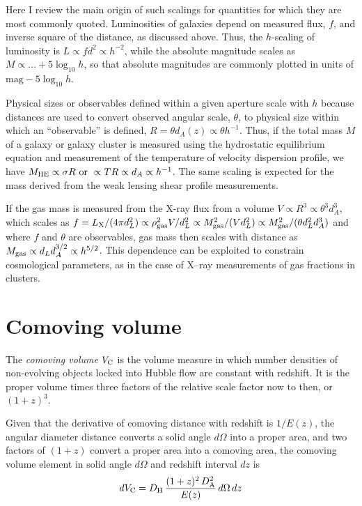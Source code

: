 Here I review the main origin of such scalings for quantities for which they are most commonly quoted. 
Luminosities of galaxies depend on measured flux, $f$, and inverse square of the distance, as discussed above. 
Thus, the $h$-scaling of luminosity is $L\propto f d^{2}\propto h^{-2}$, while the absolute magnitude scales as $M\propto \ldots +5\log_{10}h$, so that absolute magnitudes are commonly plotted in units of $\mathrm{mag}-5\log_{10}h$. 

Physical sizes or observables defined within a given aperture scale with $h$ 
because distances are used to convert observed angular scale, $\theta$, to physical
size within which an ``observable'' is defined, 
$R=\theta d_A(z)\propto \theta h^{-1}$.
Thus, if the total mass $M$ of a galaxy or galaxy cluster is measured using the hydrostatic equilibrium equation and measurement of the temperature of velocity dispersion profile, we have $M_{\rm HE}\propto \sigma R\ \mathrm{or}\ \propto T R\propto d_A\propto h^{-1}$. The same scaling is expected for the mass derived from the weak lensing shear profile measurements. 

If the gas mass is measured from the X-ray flux from a volume
$V\propto R^3\propto \theta^3d_A^3$, which scales as $f=L_{\rm X}/(4\pi
d_L^2)\propto \rho_{\rm gas}^2 V/d_L^2\propto M_{\rm gas}^2/(Vd_L^2)\propto
M_{\rm gas}^2/(\theta d_L^2 d_A^3)$ and where $f$ and $\theta$ are
observables, gas mass then scales with distance as $M_{\rm gas}\propto d_L
d_A^{3/2}\propto h^{5/2}$. This dependence can be exploited to
constrain cosmological parameters, as in the case of X--ray
measurements of gas fractions in clusters.  

\section{Comoving volume}
\label{sec:Vcom}

The {\it comoving volume\/} $V_{\rm C}$ is the volume measure in which
number densities of non-evolving objects locked into Hubble flow are
constant with redshift.  It is the proper volume times three factors
of the relative scale factor now to then, or $(1+z)^3.$

Given that the
derivative of comoving distance with redshift is $1/E(z)$, the angular diameter distance converts a solid angle
$d\Omega$ into a proper area, and two factors of $(1+z)$ convert a
proper area into a comoving area, the comoving volume element in solid
angle $d\Omega$ and redshift interval $dz$ is
\begin{equation}
dV_{\rm C}= D_{\rm H}\,\frac{(1+z)^2\,D_{\rm A}^2}{E(z)}\,d\Omega\,dz
\end{equation}

